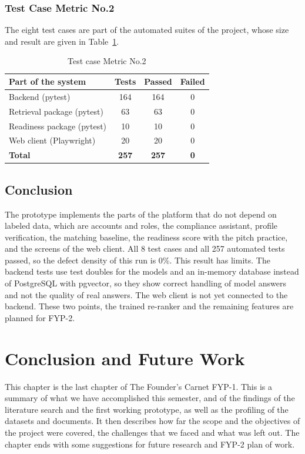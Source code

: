 \documentclass{FastFyp}
\begin{document}
\subsection{Test Case Metric No.2}
The eight test cases are part of the automated suites of the project, whose size and result are given in Table~\ref{tab:suite}.

\begin{table}[!ht]
\centering
\caption{Test case Metric No.2}
\label{tab:suite}
\small
\setlength{\tabcolsep}{3pt}
\renewcommand{\arraystretch}{1.25}
\begin{tabular}{|l|c|c|c|}
\hline
\textbf{Part of the system} & \textbf{Tests} & \textbf{Passed} & \textbf{Failed} \\ \hline
Backend (pytest) & 164 & 164 & 0 \\ \hline
Retrieval package (pytest) & 63 & 63 & 0 \\ \hline
Readiness package (pytest) & 10 & 10 & 0 \\ \hline
Web client (Playwright) & 20 & 20 & 0 \\ \hline
\textbf{Total} & \textbf{257} & \textbf{257} & \textbf{0} \\ \hline
\end{tabular}
\end{table}


\section{Conclusion}
The prototype implements the parts of the platform that do not depend on labeled data, which are accounts and roles, the compliance assistant, profile verification, the matching baseline, the readiness score with the pitch practice, and the screens of the web client. All 8 test cases and all 257 automated tests passed, so the defect density of this run is 0\%. This result has limits. The backend tests use test doubles for the models and an in-memory database instead of PostgreSQL with pgvector, so they show correct handling of model answers and not the quality of real answers. The web client is not yet connected to the backend. These two points, the trained re-ranker and the remaining features are planned for FYP-2.

\chapter{Conclusion and Future Work}\label{chap:conclusion}
This chapter is the last chapter of The Founder's Carnet FYP-1. This is a summary of what we have accomplished this semester, and of the findings of the literature search and the first working prototype, as well as the profiling of the datasets and documents. It then describes how far the scope and the objectives of the project were covered, the challenges that we faced and what was left out. The chapter ends with some suggestions for future research and FYP-2 plan of work.
\end{document}
